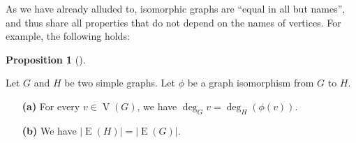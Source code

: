 \documentclass[numbers=enddot,12pt,final,onecolumn,notitlepage]{scrartcl}%
\theoremstyle{definition}
\newtheorem{prop}[theo]{Proposition}
\newenvironment{proposition}[1][]
{\begin{prop}[#1]\begin{leftbar}}
{\end{leftbar}\end{prop}}
\newcommand{\abs}[1]{\left| #1 \right|}
\newcommand{\tup}[1]{\left( #1 \right)}
\newcommand{\verts}[1]{\operatorname{V}\left( #1 \right)}
\newcommand{\edges}[1]{\operatorname{E}\left( #1 \right)}
\begin{document}
As we have already alluded to, isomorphic graphs are ``equal in all
but names'', and thus share all properties that do not depend on the
names of vertices. For example, the following holds:

\begin{proposition} \label{prop.intro.iso.degrees}
Let $G$ and $H$ be two simple graphs. Let $\phi$ be a graph
isomorphism from $G$ to $H$.

\begin{enumerate}

\item[\textbf{(a)}] For every $v \in \verts{G}$, we have
$\deg_G v = \deg_H \tup{\phi\tup{v}}$.

\item[\textbf{(b)}] We have
$\abs{\edges{H}} = \abs{\edges{G}}$.

\end{enumerate}

\end{proposition}
\end{document}
